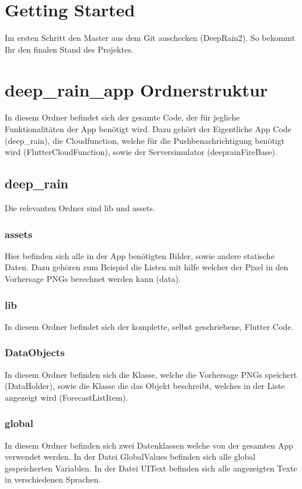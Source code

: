 \section{Getting Started}
Im ersten Schritt den Master aus dem Git auschecken (DeepRain2). So bekommt Ihr den finalen Stand des Projektes. 

\section{deep\_rain\_app Ordnerstruktur}
In diesem Ordner befindet sich der gesamte Code, der für jegliche Funktionalitäten der App benötigt wird. 
Dazu gehört der Eigentliche App Code (deep\_rain), die Cloudfunction, welche für die Pushbenachrichtigung benötigt wird (FlutterCloudFunction),
sowie der Serversimulator (deeprainFireBase). 

\subsection{deep\_rain}
Die relevanten Ordner sind lib und assets. 
\subsubsection{assets}
Hier befinden sich alle in der App benötigten Bilder, sowie andere statische Daten. 
Dazu gehören zum Beispiel die Listen mit hilfe welcher der Pixel in den Vorhersage PNGs berechnet werden kann (data). 

\subsubsection{lib}
In diesem Ordner befindet sich der komplette, selbst geschriebene, Flutter Code. 
\subsubsection*{DataObjects}
In diesem Ordner befinden sich die Klasse, welche die Vorhersage PNGs speichert (DataHolder), sowie
die Klasse die das Objekt beschreibt, welches in der Liste angezeigt wird (ForecastListItem).
\subsubsection*{global}
In diesem Ordner befinden sich zwei Datenklassen welche von der gesamten App verwendet werden. 
In der Datei GlobalValues befinden sich alle global gespeicherten Variablen.
In der Datei UIText befinden sich alle angezeigten Texte in verschiedenen Sprachen. 

